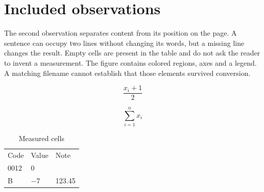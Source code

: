 \section{Included observations}\label{observations}

The second observation separates content from its position on the page. A sentence can occupy two lines without changing its words, but a missing line changes the result. Empty cells are present in the table and do not ask the reader to invent a measurement. The figure contains colored regions, axes and a legend. A matching filename cannot establish that those elements survived conversion.

\[
\frac{x_i+1}{2}
\]

\[
\sum_{i=1}^{n}x_i
\]

\begin{table}
\begin{tabular}{lll}
Code & Value & Note\\
0012 & 0 & \\
B & −7 & 123.45
\end{tabular}
\caption{Measured cells}
\end{table}

